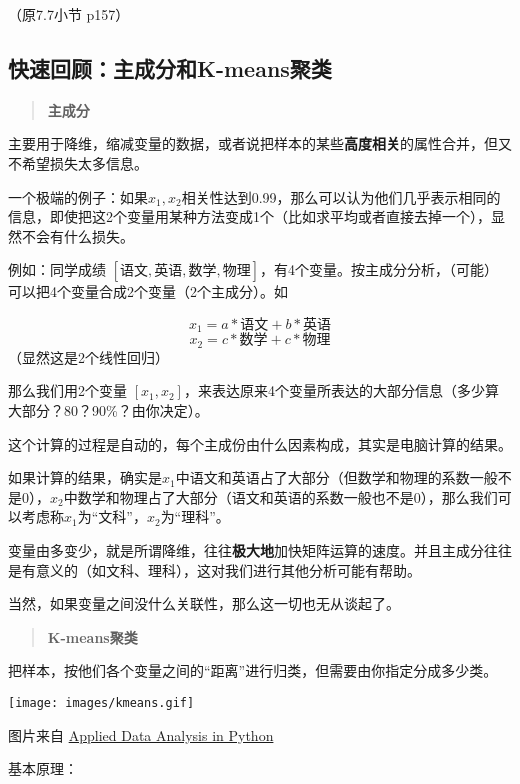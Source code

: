\documentclass[
  letterpaper,
  DIV=11,
  numbers=noendperiod]{scrreprt}
\begin{document}
（原7.7小节 p157）

\hypertarget{ux5febux901fux56deux987eux4e3bux6210ux5206ux548ck-meansux805aux7c7b}{%
\subsection{快速回顾：主成分和K-means聚类}\label{ux5febux901fux56deux987eux4e3bux6210ux5206ux548ck-meansux805aux7c7b}}

\begin{quote}
\textbf{主成分}
\end{quote}

主要用于降维，缩减变量的数据，或者说把样本的某些\textbf{高度相关}的属性合并，但又不希望损失太多信息。

一个极端的例子：如果\(x_1,x_2\)相关性达到0.99，那么可以认为他们几乎表示相同的信息，即使把这2个变量用某种方法变成1个（比如求平均或者直接去掉一个），显然不会有什么损失。

例如：同学成绩
\([语文,英语,数学,物理]\)，有4个变量。按主成分分析，（可能）可以把4个变量合成2个变量（2个主成分）。如

\[
x_1 = a * 语文 + b * 英语
\] \[
x_2 = c * 数学 + c * 物理
\] （显然这是2个线性回归）

那么我们用2个变量
\([x_1, x_2]\)，来表达原来4个变量所表达的大部分信息（多少算大部分？80？90\%？由你决定）。

这个计算的过程是自动的，每个主成份由什么因素构成，其实是电脑计算的结果。

如果计算的结果，确实是\(x_1\)中语文和英语占了大部分（但数学和物理的系数一般不是0），\(x_2\)中数学和物理占了大部分（语文和英语的系数一般也不是0），那么我们可以考虑称\(x_1\)为``文科''，\(x_2\)为``理科''。

变量由多变少，就是所谓降维，往往\textbf{极大地}加快矩阵运算的速度。并且主成分往往是有意义的（如文科、理科），这对我们进行其他分析可能有帮助。

当然，如果变量之间没什么关联性，那么这一切也无从谈起了。

\begin{quote}
\textbf{K-means聚类}
\end{quote}

把样本，按他们各个变量之间的``距离''进行归类，但需要由你指定分成多少类。

\texttt{[image: images/kmeans.gif]}

图片来自
\href{https://milliams.com/courses/applied_data_analysis/appendix_clustering.html}{Applied
Data Analysis in Python}

基本原理：
\end{document}
